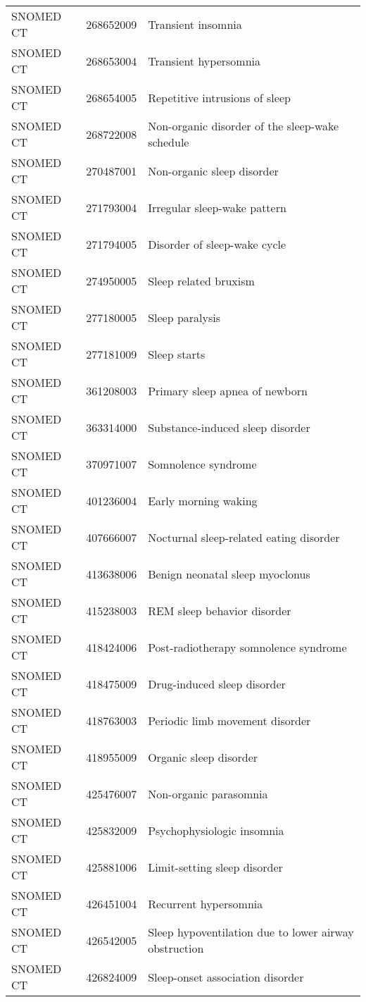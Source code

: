 \begin{longtable}{p{}p{}p{}}
  SNOMED CT & 268652009 & Transient insomnia \\ 
  SNOMED CT & 268653004 & Transient hypersomnia \\ 
  SNOMED CT & 268654005 & Repetitive intrusions of sleep \\ 
  SNOMED CT & 268722008 & Non-organic disorder of the sleep-wake schedule \\ 
  SNOMED CT & 270487001 & Non-organic sleep disorder \\ 
  SNOMED CT & 271793004 & Irregular sleep-wake pattern \\ 
  SNOMED CT & 271794005 & Disorder of sleep-wake cycle \\ 
  SNOMED CT & 274950005 & Sleep related bruxism \\ 
  SNOMED CT & 277180005 & Sleep paralysis \\ 
  SNOMED CT & 277181009 & Sleep starts \\ 
  SNOMED CT & 361208003 & Primary sleep apnea of newborn \\ 
  SNOMED CT & 363314000 & Substance-induced sleep disorder \\ 
  SNOMED CT & 370971007 & Somnolence syndrome \\ 
  SNOMED CT & 401236004 & Early morning waking \\ 
  SNOMED CT & 407666007 & Nocturnal sleep-related eating disorder \\ 
  SNOMED CT & 413638006 & Benign neonatal sleep myoclonus \\ 
  SNOMED CT & 415238003 & REM sleep behavior disorder \\ 
  SNOMED CT & 418424006 & Post-radiotherapy somnolence syndrome \\ 
  SNOMED CT & 418475009 & Drug-induced sleep disorder \\ 
  SNOMED CT & 418763003 & Periodic limb movement disorder \\ 
  SNOMED CT & 418955009 & Organic sleep disorder \\ 
  SNOMED CT & 425476007 & Non-organic parasomnia \\ 
  SNOMED CT & 425832009 & Psychophysiologic insomnia \\ 
  SNOMED CT & 425881006 & Limit-setting sleep disorder \\ 
  SNOMED CT & 426451004 & Recurrent hypersomnia \\ 
  SNOMED CT & 426542005 & Sleep hypoventilation due to lower airway obstruction \\ 
  SNOMED CT & 426824009 & Sleep-onset association disorder \\ 

\end{longtable}
